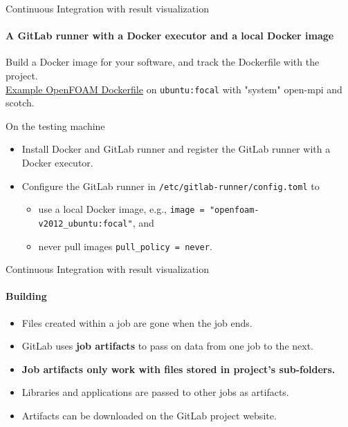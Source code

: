 \documentclass[
	aspectratio=169,%
	color={accentcolor=2d},
	logo=true,%
	colorframetitle=true,%
	]{tudabeamer}
\begin{document}
\begin{frame}{Continuous Integration with result visualization} 
    \framesubtitle{A GitLab runner with a Docker executor and a local Docker image}

    \vfill 
    Build a Docker image for your software, and track the Dockerfile with the project.\\
    \medskip
    \href{https://gitlab.com/tmaric/fvc-reconstruct/-/tree/main/docker}{Example OpenFOAM Dockerfile} on \texttt{ubuntu:focal} with "system" open-mpi and scotch.

    \medskip
    On the testing machine
    \begin{itemize}
        \item Install Docker and GitLab runner and register the GitLab runner with a Docker executor.
        \item Configure the GitLab runner in \texttt{/etc/gitlab-runner/config.toml} to
            \begin{itemize}
                \item use a local Docker image, e.g., \texttt{image = "openfoam-v2012\_ubuntu:focal"}, and
                \item never pull images \texttt{pull\_policy = never}.
            \end{itemize}
    \end{itemize}


\end{frame}

\begin{frame}{Continuous Integration with result visualization} 
    \framesubtitle{Building}

    \vfill
    \begin{itemize}
        \item Files created within a job are gone when the job ends. 
        \item GitLab uses \textbf{job artifacts} to pass on data from one job to the next. 
        \item \textbf{Job artifacts only work with files stored in project's sub-folders.} 
        \item Libraries and applications are passed to other jobs as artifacts. 
        \item Artifacts can be downloaded on the GitLab project website.  
    \end{itemize}

\end{frame}
\end{document}
